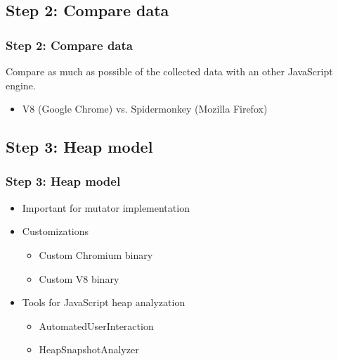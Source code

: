 \documentclass{beamer}
\begin{document}
	\subsection{Step 2: Compare data}
	\begin{frame}
		\frametitle{Step 2: Compare data}
		Compare as much as possible of the collected data with an other JavaScript engine.
		\begin{itemize}
			\item V8 (Google Chrome) vs. Spidermonkey (Mozilla Firefox)
		\end{itemize} 
	\end{frame}
	
	\subsection{Step 3: Heap model}
	\begin{frame}
		\frametitle{Step 3: Heap model}
		\begin{itemize}
			\item Important for mutator implementation
			\item Customizations
			\begin{itemize}
				\item Custom Chromium binary
				\item Custom V8 binary
			\end{itemize}
			
			\pause
			
			\item Tools for JavaScript heap analyzation
			\begin{itemize}
				\item AutomatedUserInteraction
				\item HeapSnapshotAnalyzer
			\end{itemize}
		\end{itemize}
	\end{frame}
	
\end{document}
